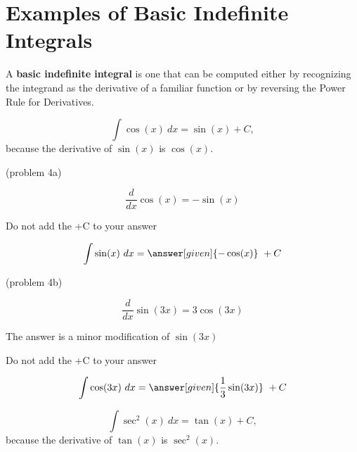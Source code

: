 \documentclass{ximera}
\begin{document}
\section{Examples of Basic Indefinite Integrals}

A \textbf{basic indefinite integral} is one that can be computed either by recognizing the integrand as the 
derivative of a familiar function or by reversing the Power Rule for Derivatives.



\begin{example}[example 4]
\[
\int \cos(x) \ dx = \sin(x) + C,
\]
because the derivative of $\sin(x)$ is $\cos(x)$.

\end{example}

\begin{problem}(problem 4a)

\begin{hint}
\[
\frac{d}{dx} \cos(x) = -\sin(x)
\]
\end{hint}
\begin{hint}
\begin{center}
Do not add the +C to your answer
\end{center}
\end{hint}

\[
\int \sin(x) \ dx =
\answer[given]{-\cos(x)} \ + C
\]
\end{problem}

\begin{problem}(problem 4b)

\begin{hint}
\[
\frac{d}{dx} \sin(3x) = 3\cos(3x)
\]
\end{hint}
\begin{hint}
The answer is a minor modification of $\sin(3x)$
\end{hint}
\begin{hint}
\begin{center}
Do not add the +C to your answer
\end{center}
\end{hint}

\[
\int \cos(3x) \ dx =
\answer[given]{\frac13 \sin(3x)} \ + C
\]
\end{problem}

\begin{example}[example 5]
\[
\int \sec^2(x) \ dx = \tan(x) + C,
\]
because the derivative of $\tan(x)$ is $\sec^2(x)$.

\end{example}
\end{document}
